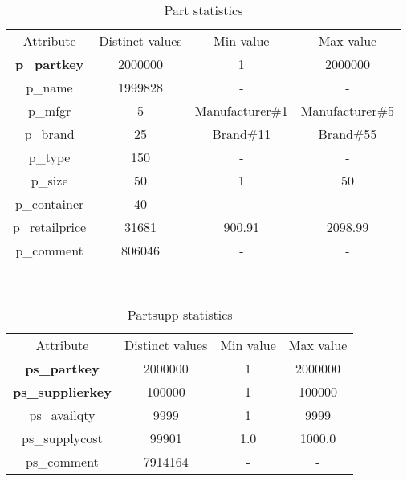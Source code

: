 \begin{table}[H]
\centering
\begin{tabular}{c|c|c|c}
\rowcolor{blue!50} Attribute & Distinct values & Min value & Max value\\
\rowcolor{gray!10} \textbf{p\_partkey} & 2000000 & 1 & 2000000 \\ 
\rowcolor{white} p\_name & 1999828 & - & -\\ 
\rowcolor{gray!10} p\_mfgr & 5 & Manufacturer\#1 & Manufacturer\#5 \\ 
\rowcolor{white} p\_brand & 25 & Brand\#11 & Brand\#55\\ 
\rowcolor{gray!10} p\_type & 150 & - & - \\
\rowcolor{white} p\_size & 50 & 1 & 50 \\
\rowcolor{gray!10} p\_container & 40 & - & - \\
\rowcolor{white} p\_retailprice & 31681 & 900.91 & 2098.99 \\
\rowcolor{gray!10} p\_comment & 806046 & - & - \\
\end{tabular}\\[0.5cm]
    \caption{Part statistics}
\end{table}

\begin{table}[H]
\centering
\begin{tabular}{c|c|c|c} 
\rowcolor{blue!50} Attribute & Distinct values & Min value & Max value \\ 
\rowcolor{gray!10} \textbf{ps\_partkey} & 2000000 & 1 & 2000000 \\
\rowcolor{white} \textbf{ps\_supplierkey} & 100000 & 1 & 100000 \\
\rowcolor{gray!10} ps\_availqty & 9999 & 1 & 9999 \\
\rowcolor{white} ps\_supplycost & 99901 & 1.0 & 1000.0 \\
\rowcolor{gray!10} ps\_comment & 7914164 & - & - \\
\end{tabular}\\[0.5cm] 
    \caption{Partsupp statistics}
\end{table}

